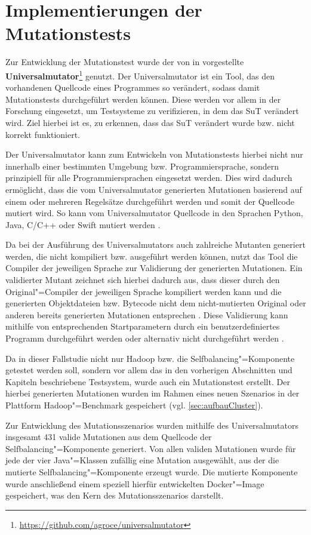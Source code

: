 \section{Implementierungen der Mutationstests}
\label{sec:implMutationTests}

Zur Entwicklung der Mutationstest wurde der von \citeauthor{Groce2018} in \cite{Groce2018} vorgestellte \textbf{Universalmutator}\footnote{\url{https://github.com/agroce/universalmutator}} genutzt.
Der Universalmutator ist ein Tool, das den vorhandenen Quellcode eines Programmes so verändert, sodass damit Mutationstests durchgeführt werden können.
Diese werden vor allem in der Forschung eingesetzt, um Testsysteme zu verifizieren, in dem das \ac{SuT} verändert wird.
Ziel hierbei ist es, zu erkennen, dass das \ac{SuT} verändert wurde bzw. nicht korrekt funktioniert.

Der Universalmutator kann zum Entwickeln von Mutationstests hierbei nicht nur innerhalb einer bestimmten Umgebung bzw. Programmiersprache, sondern prinzipiell für alle Programmiersprachen eingesetzt werden.
Dies wird dadurch ermöglicht, dass die vom Universalmutator generierten Mutationen basierend auf einem oder mehreren Regelsätze durchgeführt werden und somit der Quellcode mutiert wird.
So kann vom Universalmutator Quellcode \uA in den Sprachen Python, Java, C/C++ oder Swift mutiert werden \cite{Groce2018}.

Da bei der Ausführung des Universalmutators auch zahlreiche Mutanten generiert werden, die nicht kompiliert bzw. ausgeführt werden können, nutzt das Tool die Compiler der jeweiligen Sprache zur Validierung der generierten Mutationen.
Ein validierter Mutant zeichnet sich hierbei dadurch aus, dass dieser durch den Original"=Compiler der jeweiligen Sprache kompiliert werden kann und die generierten Objektdateien bzw. Bytecode nicht dem nicht-mutierten Original oder anderen bereits generierten Mutationen entsprechen \cite{Groce2018}.
Diese Validierung kann mithilfe von entsprechenden Startparametern durch ein benutzerdefiniertes Programm durchgeführt werden oder alternativ nicht durchgeführt werden \cite{Groce2018,UniversalmutatorSourceGenmutants}.

Da in dieser Fallstudie nicht nur Hadoop bzw. die Selfbalancing"=Komponente getestet werden soll, sondern vor allem das in den vorherigen Abschnitten und Kapiteln beschriebene Testsystem, wurde auch ein Mutationstest erstellt.
Der hierbei generierten Mutationen wurden im Rahmen eines neuen Szenarios in der Plattform Hadoop"=Benchmark gespeichert (vgl. \autoref{sec:aufbauCluster}).

Zur Entwicklung des Mutationsszenarios wurden mithilfe des Universalmutators insgesamt 431 valide Mutationen aus dem Quellcode der Selfbalancing"=Komponente generiert.
Von allen validen Mutationen wurde für jede der vier Java"=Klassen zufällig eine Mutation ausgewählt, aus der die mutierte Selfbalancing"=Komponente erzeugt wurde.
Die mutierte Komponente wurde anschließend einem speziell hierfür entwickelten Docker"=Image gespeichert, was den Kern des Mutationsszenarios darstellt.
